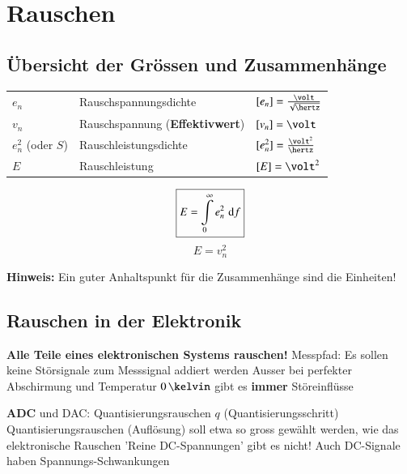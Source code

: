 \section{Rauschen}

\subsection{Übersicht der Grössen und Zusammenhänge}

\begin{minipage}[c]{0.8\columnwidth}
    \renewcommand{\arraystretch}{1.5}
    \begin{tabular}{lll}
        $e_n$               & Rauschspannungsdichte                     & $[e_n] = \frac{\volt}{\sqrt{\hertz}}$ \\
        $v_n$               & Rauschspannung (\textbf{Effektivwert})    & $[v_n] = \volt$ \\
        $e_n^2$ (oder $S$)  & Rauschleistungsdichte                     & $[e_n^2] = \frac{\volt^2}{\hertz}$ \\
        $E$                 & Rauschleistung                            & $[E] = \volt^2$ \\
    \end{tabular}
    \renewcommand{\arraystretch}{1}
\end{minipage}
\hfill
\begin{minipage}[c]{0.18\columnwidth}
    $$ \boxed{ E = \int\limits_{0}^{\infty} e_n^2 \, \mathop{} \! \mathrm{d} f } $$
    $$ \boxed{ E =  v_n^2 } $$
\end{minipage}

\vspace{0.2cm}
\textbf{Hinweis:} Ein guter Anhaltspunkt für die Zusammenhänge sind die Einheiten!


\subsection{Rauschen in der Elektronik}

\begin{outline}
    \1 \textbf{Alle Teile eines elektronischen Systems rauschen!}
    \1 Messpfad: Es sollen keine Störsignale zum Messsignal addiert werden
        \2 Ausser bei perfekter Abschirmung und Temperatur $0 \, \kelvin$ gibt es \textbf{immer} Störeinflüsse
\end{outline}

\begin{outline}
    \1 \textbf{ADC} und DAC: Quantisierungsrauschen $q$ (Quantisierungsschritt)
        \2 Quantisierungsrauschen (Auflösung) soll etwa so gross gewählt werden, wie das elektronische Rauschen
    \1 'Reine DC-Spannungen' gibt es nicht!
        \2 Auch DC-Signale haben Spannungs-Schwankungen
\end{outline}


